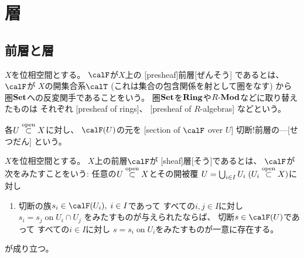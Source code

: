 \documentclass[report]{jlreq}
\begin{document}
%
\chapter{層}

%
\section{前層と層}

\begin{definition}[前層]
    $X$を位相空間とする。
    $\calF$が$X$上の
    [presheaf]{前層}[ぜんそう]
    であるとは、
    $\calF$が
    $X$の開集合系$\calT$ (これは集合の包含関係を射として圏をなす) から
    圏$\mathbf{Set}$への反変関手であることをいう。
    圏$\mathbf{Set}$を$\mathbf{Ring}$や$R\text{-}\mathbf{Mod}$などに取り替えたものは
    それぞれ
    [presheaf of rings]、
    [presheaf of $R$-algebras]
    などという。

    各$U \stackrel{\text{open}}{\subset} X$に対し、
    $\calF(U)$の元を
    [section of $\calF$ over $U$]
        {切断!前層の---}[せつだん]
    という。
\end{definition}

\begin{definition}[層]
    $X$を位相空間とする。
    $X$上の前層$\calF$が
    [sheaf]{層}[そう]であるとは、
    $\calF$が次をみたすことをいう:
    任意の$U \stackrel{\text{open}}{\subset} X$とその開被覆
    $U = \bigcup_{i \in I} U_i \; (U_i \stackrel{\text{open}}{\subset} X)$に対し
    \begin{enumerate}
        \item 切断の族$s_i \in \calF(U_i), \; i \in I$であって
            すべての$i, j \in I$に対し
            $s_i = s_j \; \text{on} \; U_i \cap U_j$
            をみたすものが与えられたならば、
            切断$s \in \calF(U)$であって
            すべての$i \in I$に対し
            $s = s_i \; \text{on} \; U_i$をみたすものが一意に存在する。
    \end{enumerate}
    が成り立つ。
\end{definition}

\begin{definition}[芽と茎]
    \TODO{}
\end{definition}

%
\end{document}
